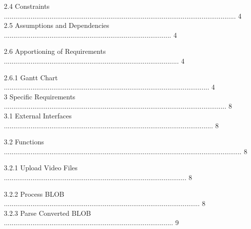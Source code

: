 \documentclass[10pt,draftclsnofoot,onecolumn]{IEEEtran}
\newcommand\tab[1][1cm]{\hspace*{#1}}
\begin{document}
\tab 2.4 Constraints .......................................................................................................................... 4\\
                 \vspace{5mm}
\tab 2.5 Assumptions and Dependencies ........................................................................................ 4\\
                 \vspace{5mm}
                 
\tab 2.6 Apportioning of Requirements ............................................................................................ 4\\
                 \vspace{5mm}

\tab\tab 2.6.1 Gantt Chart ............................................................................................................ 4\\
                 \vspace{5mm}
3 Specific Requirements ..................................................................................................................... 8\\
                 \vspace{5mm}
\tab 3.1 External Interfaces .............................................................................................................. 8\\
                 \vspace{5mm}
                 
\tab 3.2 Functions ............................................................................................................................. 8\\
                 \vspace{5mm}
                 
\tab \tab 3.2.1 Upload Video Files ................................................................................................ 8\\
                 \vspace{5mm}
                 
\tab \tab 3.2.2 Process BLOB ....................................................................................................... 8\\
                 \vspace{5mm}
\tab \tab 3.2.3 Parse Converted BLOB ......................................................................................... 9\\
                 \vspace{5mm}
                 
\end{document}

